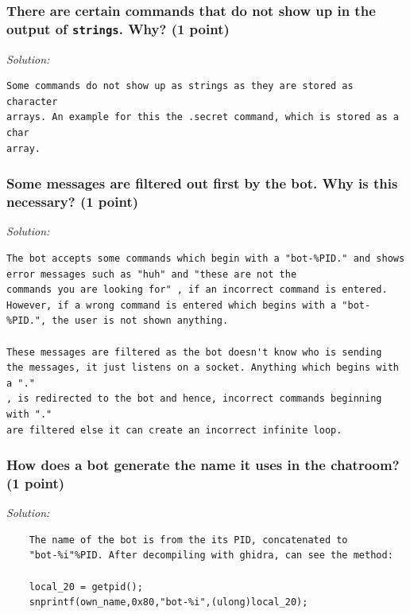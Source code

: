 \documentclass[a4paper,11pt]{article}
\newenvironment{solution}%
{\par{\noindent\small\textit{Solution:}}\vspace{-12pt}\begin{framed}}%
{\end{framed}\par}
\begin{document}
\subsubsection*{There are certain commands that do not show up in the output of
\texttt{strings}. Why? \ifsolution (1 point) \fi}
\ifsolution

\begin{solution}
\begin{verbatim}
Some commands do not show up as strings as they are stored as character
arrays. An example for this the .secret command, which is stored as a char
array.
\end{verbatim}

\end{solution}\fi


\subsubsection*{Some messages are filtered out first by the bot. Why is this necessary? \ifsolution (1 point) \fi}

\ifsolution
\begin{solution}
\begin{verbatim}
The bot accepts some commands which begin with a "bot-%PID." and shows error messages such as "huh" and "these are not the
commands you are looking for" , if an incorrect command is entered. 
However, if a wrong command is entered which begins with a "bot-%PID.", the user is not shown anything.

These messages are filtered as the bot doesn't know who is sending
the messages, it just listens on a socket. Anything which begins with a "."
, is redirected to the bot and hence, incorrect commands beginning with "."
are filtered else it can create an incorrect infinite loop.
\end{verbatim}
\end{solution}\fi


\subsubsection*{How does a bot generate the name it uses in the chatroom? \ifsolution (1 point) \fi}
\ifsolution
\begin{solution}
\begin{verbatim}
    The name of the bot is from the its PID, concatenated to
    "bot-%i"%PID. After decompiling with ghidra, can see the method: 
    
    local_20 = getpid();
    snprintf(own_name,0x80,"bot-%i",(ulong)local_20);
    
\end{verbatim}
\end{solution}\fi
\end{document}
